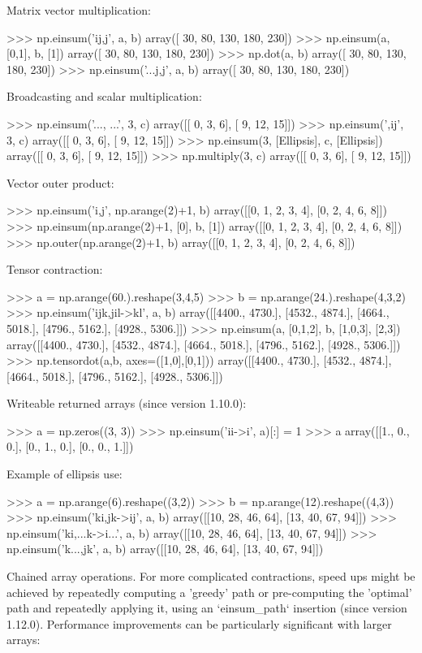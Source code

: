 \begin{DoxyVerb}
Matrix vector multiplication:

>>> np.einsum('ij,j', a, b)
array([ 30,  80, 130, 180, 230])
>>> np.einsum(a, [0,1], b, [1])
array([ 30,  80, 130, 180, 230])
>>> np.dot(a, b)
array([ 30,  80, 130, 180, 230])
>>> np.einsum('...j,j', a, b)
array([ 30,  80, 130, 180, 230])

Broadcasting and scalar multiplication:

>>> np.einsum('..., ...', 3, c)
array([[ 0,  3,  6],
       [ 9, 12, 15]])
>>> np.einsum(',ij', 3, c)
array([[ 0,  3,  6],
       [ 9, 12, 15]])
>>> np.einsum(3, [Ellipsis], c, [Ellipsis])
array([[ 0,  3,  6],
       [ 9, 12, 15]])
>>> np.multiply(3, c)
array([[ 0,  3,  6],
       [ 9, 12, 15]])

Vector outer product:

>>> np.einsum('i,j', np.arange(2)+1, b)
array([[0, 1, 2, 3, 4],
       [0, 2, 4, 6, 8]])
>>> np.einsum(np.arange(2)+1, [0], b, [1])
array([[0, 1, 2, 3, 4],
       [0, 2, 4, 6, 8]])
>>> np.outer(np.arange(2)+1, b)
array([[0, 1, 2, 3, 4],
       [0, 2, 4, 6, 8]])

Tensor contraction:

>>> a = np.arange(60.).reshape(3,4,5)
>>> b = np.arange(24.).reshape(4,3,2)
>>> np.einsum('ijk,jil->kl', a, b)
array([[4400., 4730.],
       [4532., 4874.],
       [4664., 5018.],
       [4796., 5162.],
       [4928., 5306.]])
>>> np.einsum(a, [0,1,2], b, [1,0,3], [2,3])
array([[4400., 4730.],
       [4532., 4874.],
       [4664., 5018.],
       [4796., 5162.],
       [4928., 5306.]])
>>> np.tensordot(a,b, axes=([1,0],[0,1]))
array([[4400., 4730.],
       [4532., 4874.],
       [4664., 5018.],
       [4796., 5162.],
       [4928., 5306.]])

Writeable returned arrays (since version 1.10.0):

>>> a = np.zeros((3, 3))
>>> np.einsum('ii->i', a)[:] = 1
>>> a
array([[1., 0., 0.],
       [0., 1., 0.],
       [0., 0., 1.]])

Example of ellipsis use:

>>> a = np.arange(6).reshape((3,2))
>>> b = np.arange(12).reshape((4,3))
>>> np.einsum('ki,jk->ij', a, b)
array([[10, 28, 46, 64],
       [13, 40, 67, 94]])
>>> np.einsum('ki,...k->i...', a, b)
array([[10, 28, 46, 64],
       [13, 40, 67, 94]])
>>> np.einsum('k...,jk', a, b)
array([[10, 28, 46, 64],
       [13, 40, 67, 94]])

Chained array operations. For more complicated contractions, speed ups
might be achieved by repeatedly computing a 'greedy' path or pre-computing the
'optimal' path and repeatedly applying it, using an
`einsum_path` insertion (since version 1.12.0). Performance improvements can be
particularly significant with larger arrays:


\end{DoxyVerb}
